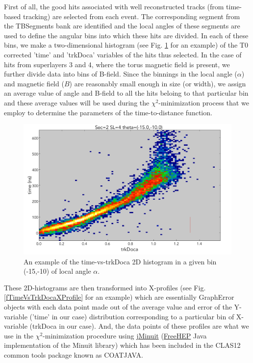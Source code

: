 \documentclass[12pt,epsfig]{article}
\begin{document}
First of all, the good hits associated with well reconstructed tracks (from time-based tracking) are selected from each event. The corresponding segment from the TBSegments bank are identified and the local angles of these segments are used to define the 
angular bins into which these hits are divided. In each of these bins, we make a two-dimensional histogram (see Fig. \ref{fTimeVsTrkDoca} for an example) of the T0 corrected 'time' and 'trkDoca' variables of the hits thus selected. In the case of hits from superlayers 3 and 4, where the torus magnetic field is present, we further divide data into bins of B-field. Since the binnings in the local angle ($\alpha$) and magnetic field ($B$) are reasonably small enough in size (or width), we assign an average value of angle and B-field to all the hits beloing to that particular bin and these average values will be used during the $\chi^2$-minimization process that we employ to determine the parameters of the time-to-distance function.


\begin{figure}
    \centering
    \includegraphics[width=1.0\textwidth]{Figures/time_vs_trkDocaExample_Sec2_SL4_th_m15_m10.png}
    \caption{An example of the time-vs-trkDoca 2D histogram in a given bin (-15,-10) of local angle $\alpha$.}
    \label{fTimeVsTrkDoca}
\end{figure}


These 2D-histograms are then transformed into X-profiles (see Fig. \ref{fTimeVsTrkDocaXProfile} for an example)  which are essentially GraphError objects with each data point made out of the average value and error of the Y-variable ('time' in our case) distribution corresponding to a particular bin of X-variable (trkDoca in our case). And, the data points of these profiles are what we use in the $\chi^2$-minimization procedure using \href{http://java.freehep.org/freehep-jminuit/}{jMinuit} (\href{http://java.freehep.org/}{FreeHEP} Java implementation of the Minuit library) which has been included in the CLAS12 common tools package known as COATJAVA.
\end{document}
